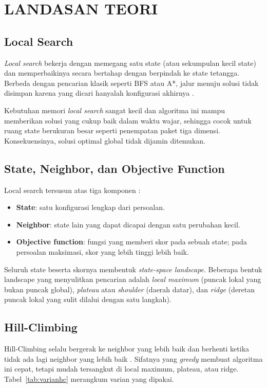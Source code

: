 \documentclass[12pt,a4paper]{report}
\begin{document}
\chapter{LANDASAN TEORI}

\section{Local Search}
\textit{Local search} bekerja dengan memegang satu state (atau sekumpulan kecil state) dan
memperbaikinya secara bertahap dengan berpindah ke state tetangga. Berbeda dengan pencarian
klasik seperti BFS atau A*, jalur menuju solusi tidak disimpan karena yang dicari hanyalah
konfigurasi akhirnya \cite{khodra1}.

Kebutuhan memori \textit{local search} sangat kecil dan algoritma ini mampu memberikan solusi
yang cukup baik dalam waktu wajar, sehingga cocok untuk ruang state berukuran besar seperti
penempatan paket tiga dimensi. Konsekuensinya, solusi optimal global tidak dijamin ditemukan.

\section{State, Neighbor, dan Objective Function}
Local search tersusun atas tiga komponen \cite{khodra2}:
\begin{itemize}[leftmargin=1.5cm]
  \item \textbf{State}: satu konfigurasi lengkap dari persoalan.
  \item \textbf{Neighbor}: state lain yang dapat dicapai dengan satu perubahan kecil.
  \item \textbf{Objective function}: fungsi yang memberi skor pada sebuah state; pada persoalan
        maksimasi, skor yang lebih tinggi lebih baik.
\end{itemize}
Seluruh state beserta skornya membentuk \textit{state-space landscape}. Beberapa bentuk landscape
yang menyulitkan pencarian adalah \textit{local maximum} (puncak lokal yang bukan puncak global),
\textit{plateau} atau \textit{shoulder} (daerah datar), dan \textit{ridge} (deretan puncak lokal yang
sulit dilalui dengan satu langkah).

\section{Hill-Climbing}
Hill-Climbing selalu bergerak ke neighbor yang lebih baik dan berhenti ketika tidak ada lagi
neighbor yang lebih baik \cite{khodra3}. Sifatnya yang \textit{greedy} membuat algoritma ini cepat,
tetapi mudah tersangkut di local maximum, plateau, atau ridge. Tabel~\ref{tab:varianhc} merangkum
varian yang dipakai.
\end{document}

